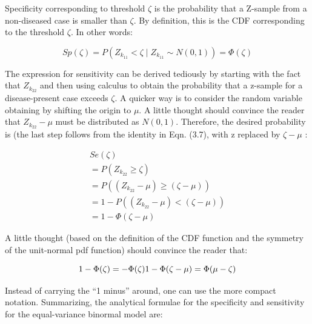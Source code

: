 \documentclass[
]{book}
\begin{document}
Specificity corresponding to threshold \(\zeta\) is the probability that a Z-sample from a non-diseased case is smaller than \(\zeta\). By definition, this is the CDF corresponding to the threshold \(\zeta\). In other words:

\begin{equation} 
Sp\left ( \zeta \right )=P\left ( Z_{k_11} < \zeta\mid Z_{k_11} \sim N\left ( 0,1 \right )\right ) = \Phi\left ( \zeta \right )
\label{eq:binary-task-model-Specificity}
\end{equation}

The expression for sensitivity can be derived tediously by starting with the fact that \(Z_{k_22}\) and then using calculus to obtain the probability that a z-sample for a disease-present case exceeds \(\zeta\). A quicker way is to consider the random variable obtaining by shifting the origin to \(\mu\). A little thought should convince the reader that \(Z_{k_22}-\mu\) must be distributed as \(N(0,1)\). Therefore, the desired probability is (the last step follows from the identity in Eqn. (3.7), with z replaced by \(\zeta-\mu\) :

\begin{equation}
\begin{aligned} 
Se\left ( \zeta \right )\\
=P\left ( Z_{k_22} \geq \zeta\right ) \\
=P\left (\left ( Z_{k_22} -\mu  \right ) \geq\left ( \zeta -\mu  \right )\right ) \\
=1-P\left (\left ( Z_{k_22} -\mu  \right ) < \left ( \zeta -\mu  \right )\right ) \\
= 1-\Phi\left ( \zeta -\mu \right )
\end{aligned}
\label{eq:binary-task-model-Sensitivity1}
\end{equation}

A little thought (based on the definition of the CDF function and the symmetry of the unit-normal pdf function) should convince the reader that:

\begin{equation} 
1-\Phi(\zeta)=-\Phi(\zeta)\\
1-\Phi(\zeta-\mu)=\Phi(\mu-\zeta)
\label{eq:binary-task-model-Sensitivity2}
\end{equation}

Instead of carrying the ``1 minus'' around, one can use the more compact notation. Summarizing, the analytical formulae for the specificity and sensitivity for the equal-variance binormal model are:
\end{document}
